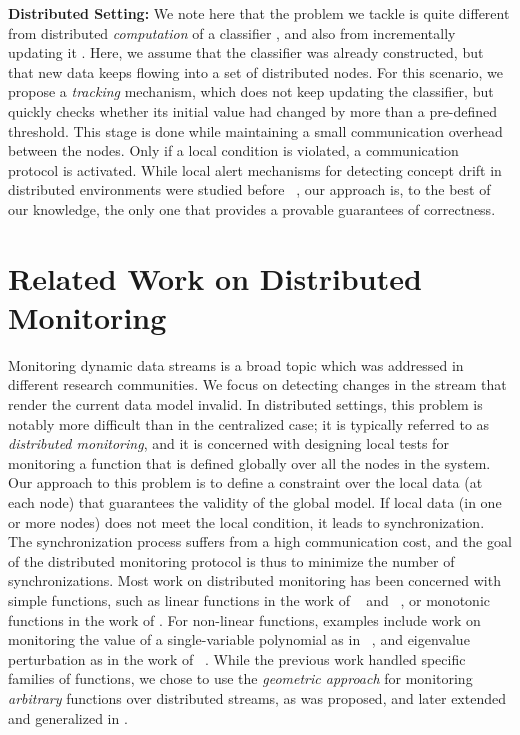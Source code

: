 \noindent \textbf{Distributed Setting:} 
We note here that the problem we tackle is quite different from distributed
{\em computation} of a classifier \cite{macua2011distributed}, and also
from incrementally updating it \cite{pang2005incremental}. Here,
we assume that the classifier was already constructed, but that new data
keeps flowing into a set of distributed nodes. For this scenario, we propose a
{\em tracking} mechanism, which does not keep updating the classifier, but
quickly checks whether its initial value had changed by more than a
pre-defined threshold. This stage is done while maintaining a small
communication overhead between the nodes. Only if a local condition
is violated, a communication protocol is activated. While local alert
mechanisms for detecting concept drift in distributed environments
were studied before ~\cite{AngGZPH13}, our approach is, to the best of our knowledge, the only one that provides a provable guarantees of correctness. 

\section{Related Work on Distributed Monitoring}
Monitoring dynamic data streams is a broad topic which was addressed in different research communities. We focus on detecting changes in the stream that render the current data model invalid. 
In distributed settings, this problem is notably more difficult than in the centralized case; it is typically referred to as \textit{distributed monitoring}, and it is concerned with designing local tests for monitoring a function that is defined globally over all the nodes in the system.
Our approach to this problem is to define a constraint over the local data (at each node) that guarantees the validity of the global model. If local data (in one or more nodes) does not meet the local condition, it leads to synchronization. The synchronization process suffers from a high communication cost, and the goal of the distributed monitoring protocol is thus to minimize the number of synchronizations. Most work on distributed monitoring has been concerned with simple functions, such as linear functions in the work of ~\cite{keralapura2006communication} and ~\cite{kashyap2008efficient}, or monotonic functions in the work of \cite{michel2005klee}.
For non-linear functions, examples include work on monitoring the value
of a single-variable polynomial as in  ~\cite{shah2008handling},
and eigenvalue perturbation as in the work of ~\cite{huang2007communication}.
While the previous work handled specific families of functions, we chose to use the 
\textit{geometric approach} for monitoring \textit{arbitrary} functions over distributed streams, as was proposed, and later extended and generalized in \cite{sharfman2007geometric, keren2014geometric,gabel2015monitoring}. 
%
